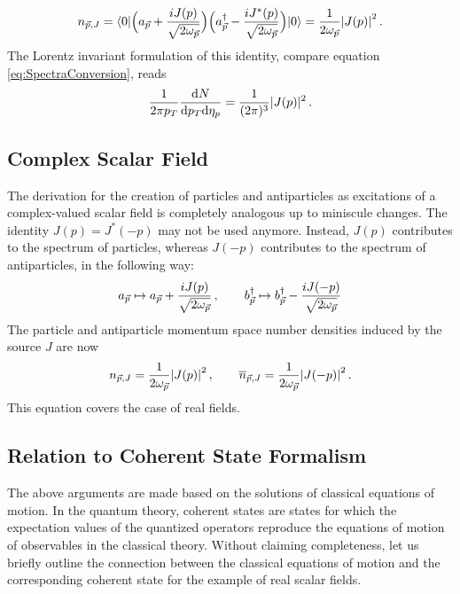 \begin{equation}
    n_{\vec{p},J}={\langle0\rvert}\Big(a_{\vec{p}}+\frac{{i} J(p)}{\sqrt{2\omega_{\vec{p}}}}\Big)\Big(a_{\vec{p}}^\dagger-\frac{{i} J^*(p)}{\sqrt{2\omega_{\vec{p}}}}\Big){\lvert0\rangle}=\frac{1}{2\omega_{\vec{p}}}{\vert J(p)\vert}^2\,.
    \label{eq:RealField_NumOpExval_Source}
\end{equation}
The Lorentz invariant formulation of this identity, compare equation \eqref{eq:SpectraConversion}, reads
\begin{equation}
    \frac{1}{2\pi p_T}\frac{\text{d} N}{\text{d} p_T\text{d}\eta_p}=\frac{1}{(2\pi)^3}\vert J(p)\vert^2\,.
\end{equation}

\subsection{Complex Scalar Field}

The derivation for the creation of particles and antiparticles as excitations of a complex-valued scalar field is completely analogous up to miniscule changes. The identity ${J(p)=J^*(-p)}$ may not be used anymore. Instead, $J(p)$ contributes to the spectrum of particles, whereas $J(-p)$ contributes to the spectrum of antiparticles, in the following way:
\begin{equation}
    a_{\vec{p}}\mapsto a_{\vec{p}}+\frac{{i} J(p)}{\sqrt{2\omega_{\vec{p}}}}\,,\qquad b_{\vec{p}}^\dagger\mapsto b_{\vec{p}}^\dagger-\frac{{i} J(-p)}{\sqrt{2\omega_{\vec{p}}}}
\end{equation}
The particle and antiparticle momentum space number densities induced by the source $J$ are now
\begin{equation}
    n_{\vec{p},J}=\frac{1}{2\omega_{\vec{p}}}{\vert J(p)\vert}^2\,,\qquad \overline{n}_{\vec{p},J}=\frac{1}{2\omega_{\vec{p}}}{\vert J(-p)\vert}^2\,.
    \label{eq:SpectraFromSource}
\end{equation}
This equation covers the case of real fields.


\subsection{Relation to Coherent State Formalism}

The above arguments are made based on the solutions of classical equations of motion. In the quantum theory, coherent states are states for which the expectation values of the quantized operators reproduce the equations of motion of observables in the classical theory. Without claiming completeness, let us briefly outline the connection between the classical equations of motion and the corresponding coherent state for the example of real scalar fields.

